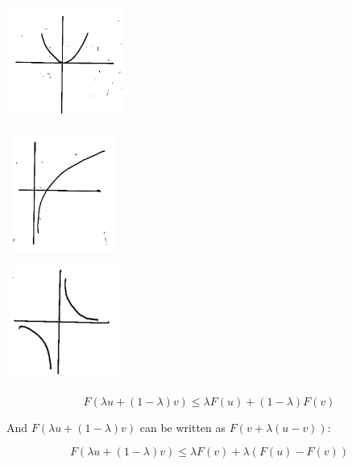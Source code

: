 \begin{marginfigure}
	\centering
	\includegraphics[width=1.5in,height=1.5in]{figures/ch08/figure1030_8.png}
\end{marginfigure}

\begin{marginfigure}
	\centering
	\includegraphics[width=1.5in,height=1.5in]{figures/ch08/figure1030_9.png}
\end{marginfigure}

\begin{marginfigure}
	\centering
	\includegraphics[width=1.5in,height=1.5in]{figures/ch08/figure1030_10.png}
\end{marginfigure}


\begin{equation*}
F(\lambda u + (1-\lambda)v) \leq \lambda F(u) + (1-\lambda)F(v)
\end{equation*}

And $F(\lambda u + (1-\lambda)v)$ can be written as $F(v + \lambda(u-v))$:

\begin{equation*}
F(\lambda u + (1-\lambda)v) \leq \lambda F(v) + \lambda(F(u)-F(v))
\end{equation*}


